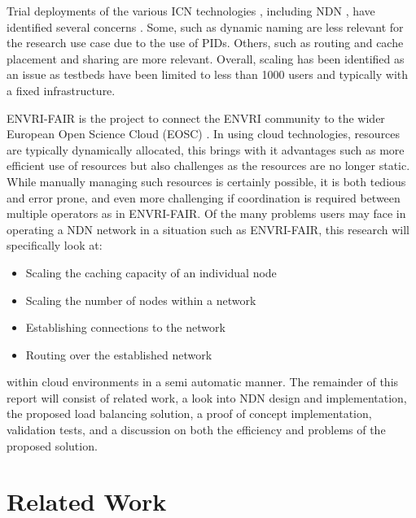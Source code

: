 \documentclass[letterpaper,12pt]{article}
\begin{document}
Trial deployments of the various ICN technologies \cite{deployguide}, including NDN \cite{ndntestbed}, have identified several concerns\cite{scalableoverview} \cite{scalablenote}. Some, such as dynamic naming are less relevant for the research use case due to the use of PIDs. Others, such as routing and cache placement and sharing are more relevant. Overall, scaling has been identified as an issue as testbeds have been limited to less than 1000 users and typically with a fixed infrastructure.

ENVRI-FAIR is the project to connect the ENVRI community to the wider European Open Science Cloud (EOSC) \cite{eosc}. In using cloud technologies, resources are typically dynamically allocated, this brings with it advantages such as more efficient use of resources but also challenges as the resources are no longer static. While manually managing such resources is certainly possible, it is both tedious and error prone, and even more challenging if coordination is required between multiple operators as in ENVRI-FAIR. Of the many problems users may face in operating a NDN network in a situation such as ENVRI-FAIR, this research will specifically look at:

\begin{itemize}
    \item Scaling the caching capacity of an individual node
    \item Scaling the number of nodes within a network
    \item Establishing connections to the network
    \item Routing over the established network
\end{itemize}

within cloud environments in a semi automatic manner. The remainder of this report will consist of related work, a look into NDN design and implementation, the proposed load balancing solution, a proof of concept implementation, validation tests, and a discussion on both the efficiency and problems of the proposed solution.




\section*{Related Work}

\end{document}
